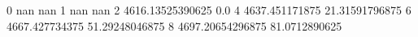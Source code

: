 0 nan nan
1 nan nan
2 4616.13525390625 0.0
4 4637.451171875 21.31591796875
6 4667.427734375 51.29248046875
8 4697.20654296875 81.0712890625
